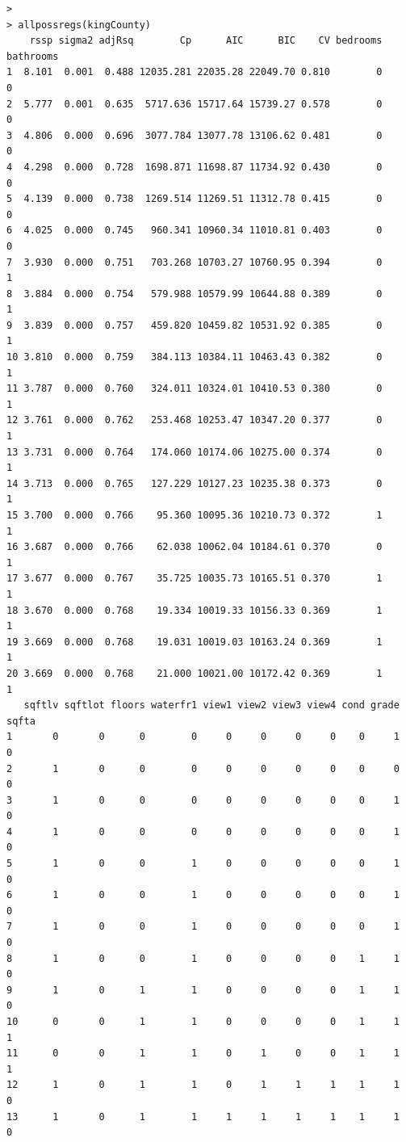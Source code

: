 \documentclass{article}%
\begin{document}
\begin{verbatim}
>
> allpossregs(kingCounty)
    rssp sigma2 adjRsq        Cp      AIC      BIC    CV bedrooms bathrooms
1  8.101  0.001  0.488 12035.281 22035.28 22049.70 0.810        0         0
2  5.777  0.001  0.635  5717.636 15717.64 15739.27 0.578        0         0
3  4.806  0.000  0.696  3077.784 13077.78 13106.62 0.481        0         0
4  4.298  0.000  0.728  1698.871 11698.87 11734.92 0.430        0         0
5  4.139  0.000  0.738  1269.514 11269.51 11312.78 0.415        0         0
6  4.025  0.000  0.745   960.341 10960.34 11010.81 0.403        0         0
7  3.930  0.000  0.751   703.268 10703.27 10760.95 0.394        0         1
8  3.884  0.000  0.754   579.988 10579.99 10644.88 0.389        0         1
9  3.839  0.000  0.757   459.820 10459.82 10531.92 0.385        0         1
10 3.810  0.000  0.759   384.113 10384.11 10463.43 0.382        0         1
11 3.787  0.000  0.760   324.011 10324.01 10410.53 0.380        0         1
12 3.761  0.000  0.762   253.468 10253.47 10347.20 0.377        0         1
13 3.731  0.000  0.764   174.060 10174.06 10275.00 0.374        0         1
14 3.713  0.000  0.765   127.229 10127.23 10235.38 0.373        0         1
15 3.700  0.000  0.766    95.360 10095.36 10210.73 0.372        1         1
16 3.687  0.000  0.766    62.038 10062.04 10184.61 0.370        0         1
17 3.677  0.000  0.767    35.725 10035.73 10165.51 0.370        1         1
18 3.670  0.000  0.768    19.334 10019.33 10156.33 0.369        1         1
19 3.669  0.000  0.768    19.031 10019.03 10163.24 0.369        1         1
20 3.669  0.000  0.768    21.000 10021.00 10172.42 0.369        1         1
   sqftlv sqftlot floors waterfr1 view1 view2 view3 view4 cond grade sqfta
1       0       0      0        0     0     0     0     0    0     1     0
2       1       0      0        0     0     0     0     0    0     0     0
3       1       0      0        0     0     0     0     0    0     1     0
4       1       0      0        0     0     0     0     0    0     1     0
5       1       0      0        1     0     0     0     0    0     1     0
6       1       0      0        1     0     0     0     0    0     1     0
7       1       0      0        1     0     0     0     0    0     1     0
8       1       0      0        1     0     0     0     0    1     1     0
9       1       0      1        1     0     0     0     0    1     1     0
10      0       0      1        1     0     0     0     0    1     1     1
11      0       0      1        1     0     1     0     0    1     1     1
12      1       0      1        1     0     1     1     1    1     1     0
13      1       0      1        1     1     1     1     1    1     1     0

\end{verbatim}
\end{document}
